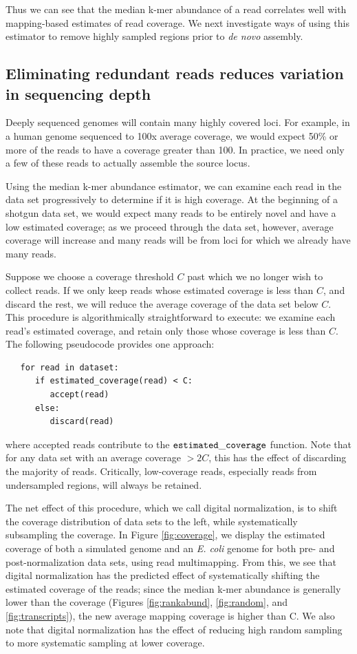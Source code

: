 \documentclass{pnastwo}
\begin{document}
\begin{article}
Thus we can see that the median k-mer abundance of a read correlates
well with mapping-based estimates of read coverage.
We next investigate ways of using this estimator to remove highly
sampled regions prior to {\em de novo} assembly.

\subsection{Eliminating redundant reads reduces variation in sequencing depth}

Deeply sequenced genomes will contain many highly covered loci.  For
example, in a human genome sequenced to 100x average coverage, we would
expect 50\% or more of the reads to have a coverage greater than 100.
In practice, we need only a few of these reads to actually assemble
the source locus.

Using the median k-mer abundance estimator, we can examine each read
in the data set progressively to determine if it is high coverage.  At
the beginning of a shotgun data set, we would expect many reads to be
entirely novel and have a low estimated coverage; as we proceed
through the data set, however, average coverage will increase and many
reads will be from loci for which we already have many reads.

Suppose we choose a coverage threshold $C$ past which we no longer
wish to collect reads. If we only keep reads whose estimated coverage
is less than $C$, and discard the rest, we will reduce the average
coverage of the data set below $C$.  This procedure is
algorithmically straightforward to execute: we examine each read's
estimated coverage, and retain only those whose coverage is less than $C$.
The following pseudocode provides one approach:
\begin{verbatim}
   for read in dataset:
      if estimated_coverage(read) < C:
         accept(read)
      else:
         discard(read)
\end{verbatim}
\noindent
where accepted reads contribute to the $\tt estimated\_coverage$
function.  Note that for any data set with an average coverage $> 2C$,
this has the effect of discarding the majority of reads.  Critically,
low-coverage reads, especially reads from undersampled regions, will
always be retained.

The net effect of this procedure, which we call digital normalization,
is to shift the coverage distribution of data sets to the left, while
systematically subsampling the coverage.  In Figure
\ref{fig:coverage}, we display the estimated coverage of both a
simulated genome and an {\em E. coli} genome for both pre- and
post-normalization data sets, using read multimapping.  From this, we
see that digital normalization has the predicted effect of
systematically shifting the estimated coverage of the reads; since the
median k-mer abundance is generally lower than the coverage (Figures
\ref{fig:rankabund}, \ref{fig:random}, and \ref{fig:transcripts}), the
new average mapping coverage is higher than C.  We also note that
digital normalization has the effect of reducing high random sampling
to more systematic sampling at lower coverage.


\end{article}
\end{document}
